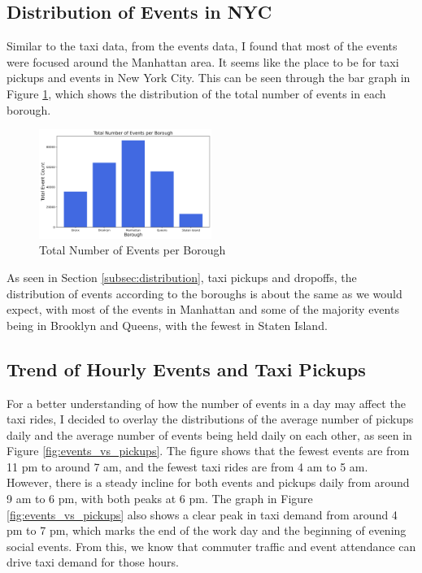 \documentclass[11pt]{article}
\begin{document}
\subsection{Distribution of Events in NYC}
Similar to the taxi data, from the events data, I found that most of the events were focused around the Manhattan area. It seems like the place to be for taxi pickups and events in New York City. This can be seen through the bar graph in Figure \ref{fig:events}, which shows the distribution of the total number of events in each borough. 

\begin{figure}[h]
    \includegraphics[width=0.5\textwidth]{plots/total_events_per_borough.png}
    \centering
    \caption{Total Number of Events per Borough}
    \label{fig:events}
\end{figure}

As seen in Section \ref{subsec:distribution}, taxi pickups and dropoffs, the distribution of events according to the boroughs is about the same as we would expect, with most of the events in Manhattan and some of the majority events being in Brooklyn and Queens, with the fewest in Staten Island.

\subsection{Trend of Hourly Events and Taxi Pickups}
For a better understanding of how the number of events in a day may affect the taxi rides, I decided to overlay the distributions of the average number of pickups daily and the average number of events being held daily on each other, as seen in Figure \ref{fig:events_vs_pickups}. The figure shows that the fewest events are from 11 pm to around 7 am, and the fewest taxi rides are from 4 am to 5 am. However, there is a steady incline for both events and pickups daily from around 9 am to 6 pm, with both peaks at 6 pm.
The graph in Figure \ref{fig:events_vs_pickups} also shows a clear peak in taxi demand from around 4 pm to 7 pm, which marks the end of the work day and the beginning of evening social events. From this, we know that commuter traffic and event attendance can drive taxi demand for those hours.
\end{document}
